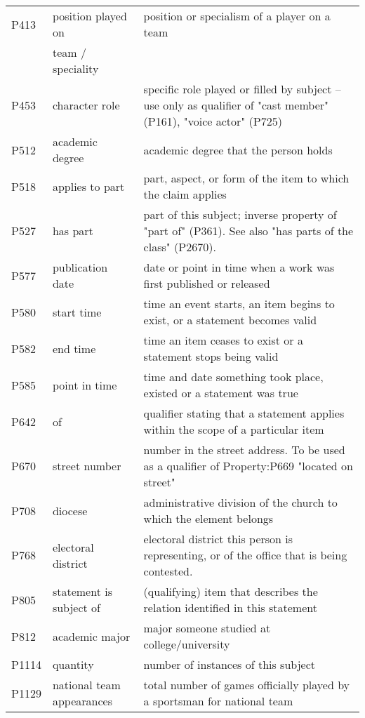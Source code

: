 \documentclass[11pt]{article}
\begin{document}
\begin{table*}[!t]
{\begin{tabular}{lll}
P413 & position played on  & position or specialism of a player on a team \\
& team / speciality & \\
P453 & character role & specific role played or filled by subject -- use only as qualifier of "cast member" (P161), "voice actor" (P725) \\
P512 & academic degree & academic degree that the person holds \\
P518 & applies to part & part, aspect, or form of the item to which the claim applies \\                                                                  
P527 & has part & part of this subject; inverse property of "part of" (P361). See also "has parts of the class" (P2670). \\
P577 & publication date & date or point in time when a work was first published or released \\          
P580 & start time & time an event starts, an item begins to exist, or a statement becomes valid \\
P582 & end time & time an item ceases to exist or a statement stops being valid \\                                                             
P585 & point in time & time and date something took place, existed or a statement was true \\                                                             
P642 & of & qualifier stating that a statement applies within the scope of a particular item \\                 
P670 & street number & number in the street address. To be used as a qualifier of Property:P669 "located on street" \\
P708 & diocese & administrative division of the church to which the element belongs \\
P768 & electoral district & electoral district this person is representing, or of the office that is being contested. \\
P805 & statement is subject of & (qualifying) item that describes the relation identified in this statement \\
P812 & academic major & major someone studied at college/university \\
P1114 & quantity & number of instances of this subject \\
P1129 & national team appearances & total number of games officially played by a sportsman for national team \\

\end{tabular}}
\end{table*}
\end{document}
